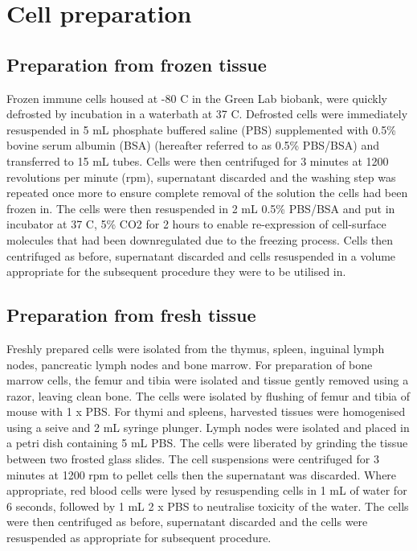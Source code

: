 \section{Cell preparation}
\label{sec:cellprep}

\subsection{Preparation from frozen tissue}

Frozen immune cells housed at -80 \textdegree C in the Green Lab biobank, were quickly defrosted by incubation in a waterbath at 37 \textdegree C.
Defrosted cells were immediately resuspended in 5 mL phosphate buffered saline (PBS) supplemented with 0.5\% bovine serum albumin (BSA) (hereafter referred to as 0.5\% PBS/BSA) and transferred to 15 mL tubes.
Cells were then centrifuged for 3 minutes at 1200 revolutions per minute (rpm), supernatant discarded and the washing step was repeated once more to ensure complete removal of the solution the cells had been frozen in.
The cells were then resuspended in 2 mL 0.5\% PBS/BSA and put in incubator at 37 \textdegree C, 5\% CO2  for 2 hours to enable re-expression of cell-surface molecules that had been downregulated due to the freezing process.
Cells then centrifuged as before, supernatant discarded and cells resuspended in a volume appropriate for the subsequent procedure they were to be utilised in.

\subsection{Preparation from fresh tissue}
Freshly prepared cells were isolated from the thymus, spleen, inguinal lymph nodes, pancreatic lymph nodes and bone marrow.
For preparation of bone marrow cells, the femur and tibia were isolated and tissue gently removed using a razor, leaving clean bone.
The cells were isolated by flushing of femur and tibia of mouse with 1 x PBS.
For thymi and spleens, harvested tissues were homogenised using a seive and 2 mL syringe plunger.
Lymph nodes were isolated and placed in a petri dish containing 5 mL PBS.
The cells were liberated by grinding the tissue between two frosted glass slides.
The cell suspensions were centrifuged for 3 minutes at 1200 rpm to pellet cells then the supernatant was discarded.
Where appropriate, red blood cells were lysed by resuspending cells in 1 mL of water for 6 seconds, followed by 1 mL 2 x PBS to neutralise toxicity of the water.
The cells were then centrifuged as before, supernatant discarded and the cells were resuspended as appropriate for subsequent procedure.

